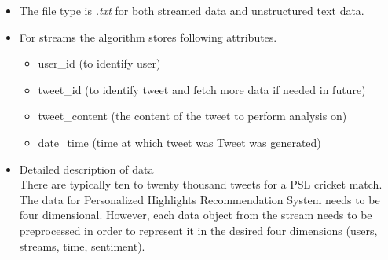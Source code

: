 \documentclass[11pt]{article}
\begin{document}
\begin{itemize}
	\item The file type is \textit{.txt} for both streamed data and unstructured text data.
	\item For streams the algorithm stores following attributes.
	\begin{itemize}
		\item user\_id (to identify user)
		\item tweet\_id (to identify tweet and fetch more data if needed in future)
		\item tweet\_content (the content of the tweet to perform analysis on)
		\item date\_time (time at which tweet was Tweet was generated)
	\end{itemize}
	\item Detailed description of data\\
	There are typically ten to twenty thousand tweets for a PSL cricket match. The data for Personalized Highlights Recommendation System needs to be four dimensional. However, each data object from the stream needs to be preprocessed in order to represent it in the desired four dimensions (users, streams, time, sentiment).
	

\end{itemize}
\end{document}
